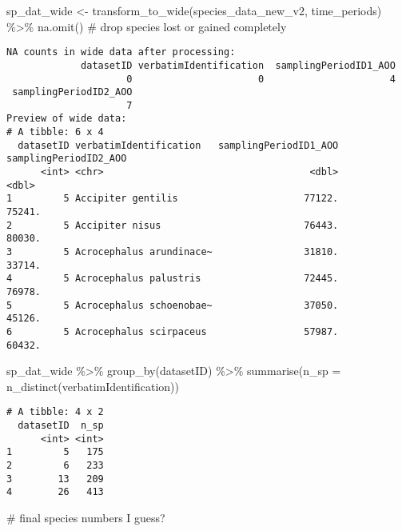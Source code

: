 \documentclass[
  letterpaper,
  DIV=11,
  numbers=noendperiod]{scrreprt}
\newenvironment{Shaded}{\begin{snugshade}}{\end{snugshade}}
\newcommand{\AttributeTok}[1]{\textcolor[rgb]{0.40,0.45,0.13}{#1}}
\newcommand{\CommentTok}[1]{\textcolor[rgb]{0.37,0.37,0.37}{#1}}
\newcommand{\FunctionTok}[1]{\textcolor[rgb]{0.28,0.35,0.67}{#1}}
\newcommand{\NormalTok}[1]{\textcolor[rgb]{0.00,0.23,0.31}{#1}}
\newcommand{\OtherTok}[1]{\textcolor[rgb]{0.00,0.23,0.31}{#1}}
\newcommand{\SpecialCharTok}[1]{\textcolor[rgb]{0.37,0.37,0.37}{#1}}
\begin{document}
\begin{Shaded}
\begin{Highlighting}[]
\NormalTok{sp\_dat\_wide }\OtherTok{\textless{}{-}} \FunctionTok{transform\_to\_wide}\NormalTok{(species\_data\_new\_v2, time\_periods) }\SpecialCharTok{\%\textgreater{}\%} \FunctionTok{na.omit}\NormalTok{() }\CommentTok{\# drop species lost or gained completely}
\end{Highlighting}
\end{Shaded}

\begin{verbatim}
NA counts in wide data after processing:
             datasetID verbatimIdentification  samplingPeriodID1_AOO
                     0                      0                      4
 samplingPeriodID2_AOO
                     7
Preview of wide data:
# A tibble: 6 x 4
  datasetID verbatimIdentification   samplingPeriodID1_AOO samplingPeriodID2_AOO
      <int> <chr>                                    <dbl>                 <dbl>
1         5 Accipiter gentilis                      77122.                75241.
2         5 Accipiter nisus                         76443.                80030.
3         5 Acrocephalus arundinace~                31810.                33714.
4         5 Acrocephalus palustris                  72445.                76978.
5         5 Acrocephalus schoenobae~                37050.                45126.
6         5 Acrocephalus scirpaceus                 57987.                60432.
\end{verbatim}

\begin{Shaded}
\begin{Highlighting}[]
\NormalTok{sp\_dat\_wide }\SpecialCharTok{\%\textgreater{}\%}
  \FunctionTok{group\_by}\NormalTok{(datasetID) }\SpecialCharTok{\%\textgreater{}\%}
  \FunctionTok{summarise}\NormalTok{(}\AttributeTok{n\_sp =} \FunctionTok{n\_distinct}\NormalTok{(verbatimIdentification))}
\end{Highlighting}
\end{Shaded}

\begin{verbatim}
# A tibble: 4 x 2
  datasetID  n_sp
      <int> <int>
1         5   175
2         6   233
3        13   209
4        26   413
\end{verbatim}

\begin{Shaded}
\begin{Highlighting}[]
\CommentTok{\# final species numbers I guess?}
\end{Highlighting}
\end{Shaded}
\end{document}
